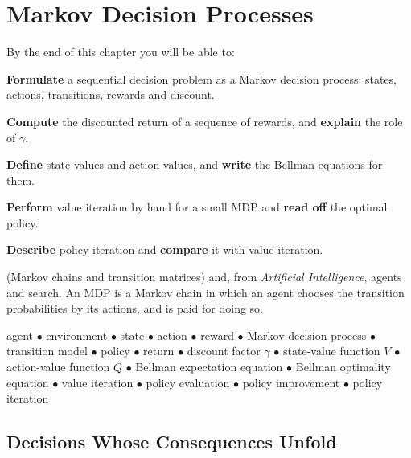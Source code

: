 \chapter{Markov Decision Processes}\label{ch:mdp}

\begin{outcomes}
By the end of this chapter you will be able to:
\begin{tight}
  \item \textbf{Formulate} a sequential decision problem as a Markov decision process:
        states, actions, transitions, rewards and discount.
  \item \textbf{Compute} the discounted return of a sequence of rewards, and
        \textbf{explain} the role of $\gamma$.
  \item \textbf{Define} state values and action values, and \textbf{write} the Bellman
        equations for them.
  \item \textbf{Perform} value iteration by hand for a small MDP and \textbf{read off}
        the optimal policy.
  \item \textbf{Describe} policy iteration and \textbf{compare} it with value iteration.
\end{tight}
\end{outcomes}

\begin{prereq}
 (Markov chains and transition matrices) and, from \emph{Artificial
Intelligence}, agents and search. An MDP is a Markov chain in which an agent chooses
the transition probabilities by its actions, and is paid for doing so.
\end{prereq}

\begin{keyterms}
agent $\bullet$ environment $\bullet$ state $\bullet$ action $\bullet$ reward
$\bullet$ Markov decision process $\bullet$ transition model $\bullet$ policy
$\bullet$ return $\bullet$ discount factor $\gamma$ $\bullet$ state-value function
$V$ $\bullet$ action-value function $Q$ $\bullet$ Bellman expectation equation
$\bullet$ Bellman optimality equation $\bullet$ value iteration $\bullet$ policy
evaluation $\bullet$ policy improvement $\bullet$ policy iteration
\end{keyterms}

\section{Decisions Whose Consequences Unfold}

